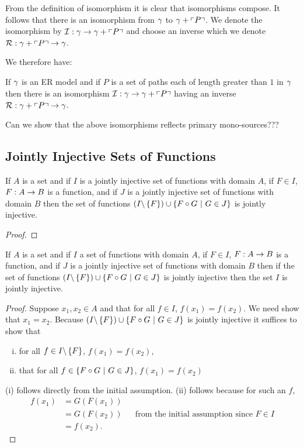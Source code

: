 From the definition of isomorphism it is clear that isomorphisms compose. It follows that there is an isomorphism from $\gamma$ to $\gamma + \left\ulcorner P\right\urcorner$. We denote the isomorphism
by $\mathcal{I}:  \gamma \rightarrow \gamma + \left\ulcorner P\right\urcorner$ and choose an inverse which we denote $\mathcal{R}: \gamma + \left\ulcorner P\right\urcorner \rightarrow \gamma$.

We therefore have:
\begin{lemma}
If $\gamma$ is an ER model and if $P$ is a set of paths each of length greater than $1$ in $\gamma$ then there is an isomorphism  $\mathcal{I}:  \gamma \rightarrow \gamma + \left\ulcorner P\right\urcorner$ having an inverse  $\mathcal{R}: \gamma + \left\ulcorner P\right\urcorner \rightarrow \gamma$.
\end{lemma}

\begin{newtt}
Can we show that the above isomorphisms reflects primary mono-sources???
\end{newtt}

\subsection{Jointly Injective Sets of Functions}
\begin{lemma}
If $A$ is a set and if $I$  is a jointly injective set of functions with domain $A$, if $F \in I$, $F: A \rightarrow B$ is a function,
and if $J$ is a jointly injective set of functions with domain $B$ then the set of functions
$(I \backslash \left\{F\right\}) \cup \left\{F \circ G \ \middle|\ G \in J\right\}$ is jointly injective.
\end{lemma}
\begin{proof}
\tbd
\end{proof}

\begin{lemma}
If $A$ is a set and if $I$  a set of functions with domain $A$, if $F \in I$, $F: A \rightarrow B$ is a function,
and if $J$ is a jointly injective set of functions with domain $B$ then if the set of functions
$(I \backslash \left\{F\right\}) \cup \left\{F \circ G \ \middle|\ G \in J\right\}$ is jointly injective then the
set $I$ is jointly injective.
\end{lemma}
\begin{proof}
Suppose $x_1,x_2 \in A$ and that for all $f \in I$, $f(x_1)=f(x_2)$. We need show that $x_1=x_2$.
Because $(I \backslash \left\{F\right\}) \cup \left\{F \circ G \ \middle|\ G \in J\right\}$ is jointly injective
it suffices to show that 
\begin{enumerate}[(i)]
\item
for all $f \in I \backslash \left\{F\right\}$, $f(x_1)=f(x_2)$, 
\item that for all $f \in \left\{F \circ G \ \middle|\ G \in J\right\}$, $f(x_1)=f(x_2)$
\end{enumerate}
(i) follows directly from the initial assumption. 
(ii) follows because for such an $f$, 
\begin{align*}
f(x_1)&=G(F(x_1)) & & \\
      &=G(F(x_2)) & & \mbox{from the initial assumption since }F \in I \\
			&=f(x_2). & &
\end{align*}
\end{proof}


